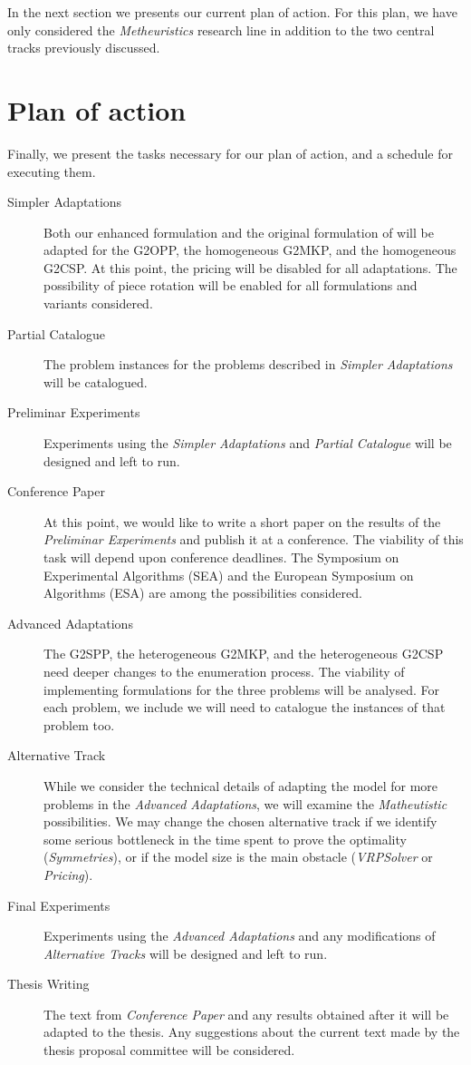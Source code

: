 \documentclass[ppgc,prop-tese,english,formais,babel]{iiufrgs}
\begin{document}
In the next section we presents our current plan of action.
For this plan, we have only considered the \emph{Metheuristics} research line in addition to the two central tracks previously discussed.

\section{Plan of action}

Finally, we present the tasks necessary for our plan of action, and a schedule for executing them.

\begin{description}
\item[Simpler Adaptations] Both our enhanced formulation and the original formulation of \citet{furini:2016} will be adapted for the G2OPP, the homogeneous G2MKP, and the homogeneous G2CSP. At this point, the pricing will be disabled for all adaptations. The possibility of piece rotation will be enabled for all formulations and variants considered.
\item[Partial Catalogue] The problem instances for the problems described in \emph{Simpler Adaptations} will be catalogued.
\item[Preliminar Experiments] Experiments using the \emph{Simpler Adaptations} and \emph{Partial Catalogue} will be designed and left to run.
\item[Conference Paper] At this point, we would like to write a short paper on the results of the \emph{Preliminar Experiments} and publish it at a conference. The viability of this task will depend upon conference deadlines. The Symposium on Experimental Algorithms (SEA) and the European Symposium on Algorithms (ESA) are among the possibilities considered.
\item[Advanced Adaptations] The G2SPP, the heterogeneous G2MKP, and the heterogeneous G2CSP need deeper changes to the enumeration process. The viability of implementing formulations for the three problems will be analysed. For each problem, we include we will need to catalogue the instances of that problem too.
\item[Alternative Track] While we consider the technical details of adapting the model for more problems in the \emph{Advanced Adaptations}, we will examine the \emph{Matheutistic} possibilities. We may change the chosen alternative track if we identify some serious bottleneck in the time spent to prove the optimality (\emph{Symmetries}), or if the model size is the main obstacle (\emph{VRPSolver} or \emph{Pricing}).
\item[Final Experiments] Experiments using the \emph{Advanced Adaptations} and any modifications of \emph{Alternative Tracks} will be designed and left to run.
\item[Thesis Writing] The text from \emph{Conference Paper} and any results obtained after it will be adapted to the thesis. Any suggestions about the current text made by the thesis proposal committee will be considered.
\end{description}
\end{document}
